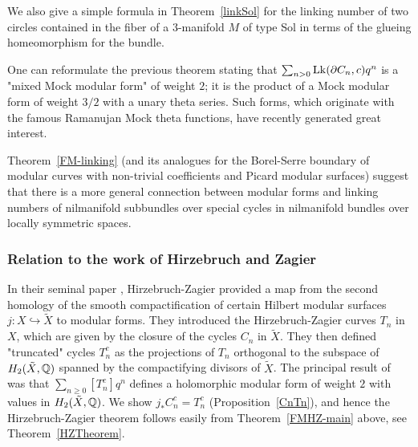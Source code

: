 We also give a simple formula in Theorem~\ref{linkSol} for the
linking number of two circles contained in the fiber of a $3$-manifold
$M$ of type Sol in terms of the glueing homeomorphism for the bundle.

One can reformulate the previous theorem stating that
$\sum_{n>0}\operatorname{Lk}(\partial C_n,c) q^n$ is a "mixed Mock modular form"
of weight $2$; it is the product of a Mock modular form of weight
$3/2$ with a unary theta series. Such forms, which originate with
the famous Ramanujan Mock theta functions, have recently generated
great interest.

Theorem~\ref{FM-linking} (and its analogues for the Borel-Serre
boundary of modular curves with non-trivial coefficients and Picard
modular surfaces) suggest that there is a more general connection
between modular forms and linking numbers of nilmanifold subbundles
over special cycles in nilmanifold  bundles over locally symmetric
spaces.









\subsubsection*{Relation to the work of Hirzebruch and Zagier}

In their seminal paper \cite{HZ}, Hirzebruch-Zagier provided a map
from the second homology of the smooth compactification of certain
Hilbert modular surfaces $j:X \hookrightarrow \tilde{X}$ to modular
forms. They introduced the Hirzebruch-Zagier curves $T_n$ in $X$,
which are given by the closure of the cycles $C_n$ in $\tilde{X}$.
They then defined "truncated" cycles $T_n^c$ as the
projections of $T_n$ orthogonal to the subspace of $H_2(\tilde{X},\mathbb{Q})$
spanned by the
compactifying divisors of $\tilde{X}$. The principal result of
\cite{HZ} was that $\sum_{n \geq 0} [T_n^c] q^n$ defines a holomorphic
modular form of weight $2$ with values in $H_2(\tilde{X},\mathbb{Q})$.
We show $j_{\ast} C_n^c = T_n^c$ (Proposition~\ref{CnTn}), and hence
the Hirzebruch-Zagier theorem follows easily from Theorem~\ref{FMHZ-main}
above, see Theorem~\ref{HZTheorem}.

